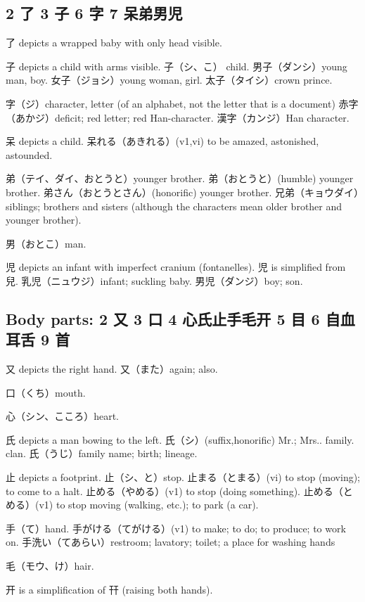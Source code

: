 \subsection{2 了 3 子 6 字 7 呆弟男児}

了 depicts a wrapped baby with only head visible.

子 depicts a child with arms visible.
子（シ、こ） child.
男子（ダンシ）young man, boy.
女子（ジョシ）young woman, girl.
太子（タイシ）crown prince.

字（ジ）character, letter (of an alphabet, not the letter that is a document)
赤字（あかジ）deficit; red letter; red Han-character.
漢字（カンジ）Han character.

呆 depicts a child.
呆れる（あきれる）(v1,vi) to be amazed, astonished, astounded.

弟（テイ、ダイ、おとうと）younger brother.
弟（おとうと）(humble) younger brother.
弟さん（おとうとさん）(honorific) younger brother.
兄弟（キョウダイ）siblings;
brothers and sisters
(although the characters mean older brother and younger brother).

男（おとこ）man.

児 depicts an infant with imperfect cranium (fontanelles).
児 is simplified from 兒.
乳児（ニュウジ）infant; suckling baby.
男児（ダンジ）boy; son.

\subsection{Body parts: 2 又 3 口 4 心氏止手毛开 5 目 6 自血耳舌 9 首}

又 depicts the right hand.
又（また）again; also.

口（くち）mouth.

心（シン、こころ）heart.

氏 depicts a man bowing to the left.
氏（シ）(suffix,honorific) Mr.; Mrs.. family. clan.
氏（うじ）family name; birth; lineage.

止 depicts a footprint.
止（シ、と）stop.
止まる（とまる）(vi) to stop (moving); to come to a halt.
止める（やめる）(v1) to stop (doing something).
止める（とめる）(v1) to stop moving (walking, etc.); to park (a car).

手（て）hand.
手がける（てがける）(v1) to make; to do; to produce; to work on.
手洗い（てあらい）restroom; lavatory; toilet; a place for washing hands

毛（モウ、け）hair.

开 is a simplification of 幵 (raising both hands).

